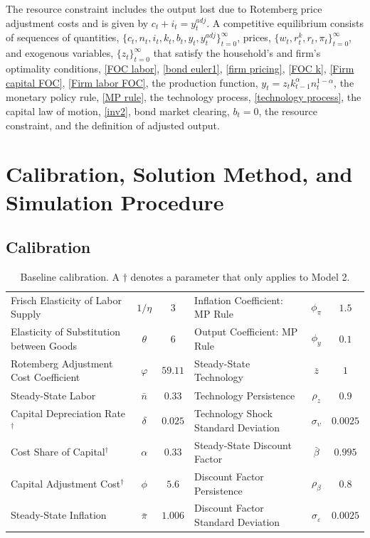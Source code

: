 \documentclass[12pt,final]{article}
\begin{document}
The resource constraint includes the output lost due to Rotemberg price adjustment costs and is given by $c_t+i_t =y_t^{adj}$. A competitive equilibrium consists of sequences of quantities, $\{c_t,n_t,i_t,k_t,b_t,y_t,y_t^{adj}\}_{t=0}^\infty$, prices, $\{w_t,r_t^k,r_t,\pi_t\}_{t=0}^\infty$, and exogenous variables, $\{z_t\}_{t=0}^\infty$ that satisfy the household's and firm's optimality conditions, \eqref{FOC labor}, \eqref{bond euler1}, \eqref{firm pricing}, \eqref{FOC k}, \eqref{Firm capital FOC}, \eqref{Firm labor FOC}, the production function, $y_t=z_tk_{t-1}^\alpha n_t^{1-\alpha}$, the monetary policy rule, \eqref{MP rule}, the technology process, \eqref{technology process}, the capital law of motion, \eqref{inv2}, bond market clearing, $b_t=0$, the resource constraint, and the definition of adjusted output.

\section{Calibration, Solution Method, and Simulation Procedure}\label{sec:calibration}

\subsection{Calibration}

\begin{table}[t]\scriptsize
  \begin{tabular*}{\textwidth}{l@{\extracolsep{\fill}}cclcc}
    \toprule
    Frisch Elasticity of Labor Supply       &$1/\eta$   & $3$    & Inflation Coefficient: MP Rule            &$\phi_\pi$    &$1.5$   \\
    Elasticity of Substitution between Goods&$\theta$   & $6$    & Output Coefficient: MP Rule               &$\phi_y$      &$0.1$   \\
    Rotemberg Adjustment Cost Coefficient   &$\varphi$  & $59.11$& Steady-State Technology                   &$\bar{z}$     &$1$     \\
    Steady-State Labor                      &$\bar{n}$  & $0.33$ & Technology Persistence                    &$\rho_z$      &$0.9$   \\
    Capital Depreciation Rate$^\dag$        &$\delta$   & $0.025$& Technology Shock Standard Deviation       &$\sigma_\upsilon$&$0.0025$\\
    Cost Share of Capital$^\dag$            &$\alpha$   & $0.33$ & Steady-State Discount Factor              &$\bar{\beta}$ &$0.995$ \\
    Capital Adjustment Cost$^\dag$          &$\phi$     & $5.6$  & Discount Factor Persistence               &$\rho_\beta$  &$0.8$   \\
    Steady-State Inflation                  &$\bar{\pi}$& $1.006$& Discount Factor Standard Deviation        &$\sigma_\varepsilon$&$0.0025$\\
    \bottomrule
  \end{tabular*}
  \caption{Baseline calibration. A $\dag$ denotes a parameter that only applies to Model 2.}
  \label{tab:calibration}
\end{table}\normalsize
\end{document}
